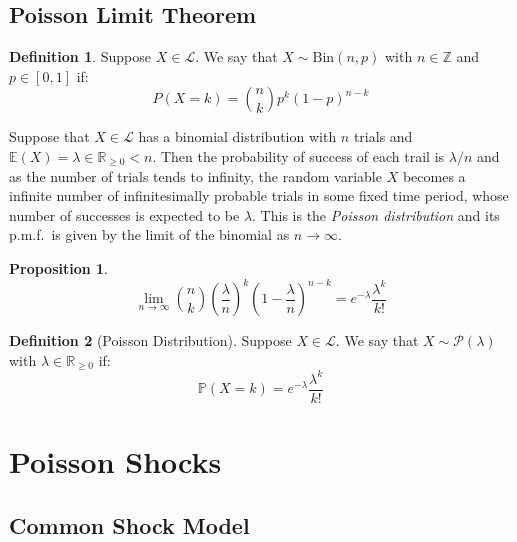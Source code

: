 \documentclass[a4paper,11pt,oneside]{book}
\theoremstyle{plain}
\newtheorem{prop}[thm]{Proposition}
\theoremstyle{definition}
\newtheorem{defn}{Definition}[section]
\begin{document}
\subsection{Poisson Limit Theorem}
\begin{defn} Suppose $X\in \mathcal{L}$. We say that $X \sim \mathrm{Bin}(n,p)$ with $n \in \mathbb{Z}$ and $p \in [0,1]$ if:
\[P(X=k)=\binom{n}{k} p^k (1-p)^{n-k}\]
\end{defn}
Suppose that $X \in \mathcal{L}$ has a binomial distribution with $n$ trials and $\mathbb{E}(X)=\lambda \in \mathbb{R}_{\ge 0}<n$. Then the probability of success of each trail is $\lambda/n$ and as the number of trials tends to infinity, the random variable $X$ becomes a infinite number of infinitesimally probable trials in some fixed time period, whose number of successes is expected to be $\lambda$. This is the \emph{Poisson distribution} and its p.m.f.~is given by the limit of the binomial as $n\rightarrow\infty$.
\begin{prop}
\[\lim_{n\rightarrow \infty}\binom{n}{k} \left(\frac{\lambda}{n}\right)^k \left(1-\frac{\lambda}{n}\right)^{n-k}=e^{-\lambda}  \frac{\lambda^k}{k!}\]
\end{prop} 
\begin{defn}[Poisson Distribution]
Suppose $X \in \mathcal{L}$. We say that $X \sim \mathcal{P}(\lambda)$ with $\lambda \in \mathbb{R}_{\ge 0}$ if:
\[\mathbb{P}(X=k)=e^{-\lambda}  \frac{\lambda^k}{k!}\]
\end{defn}
\section{Poisson Shocks}
\subsection{Common Shock Model}
\end{document}

